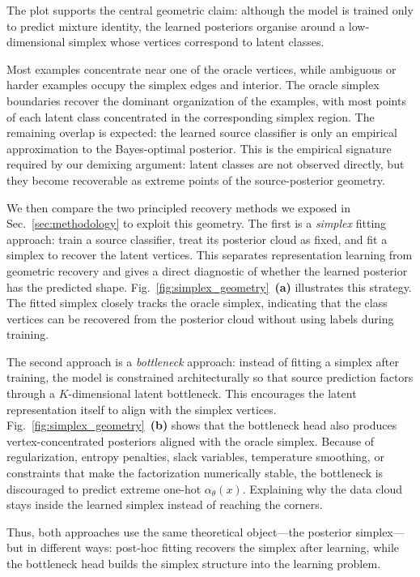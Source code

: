 \documentclass{article}
\theoremstyle{plain}
\theoremstyle{definition}
\theoremstyle{remark}
\begin{document}
The plot supports the central geometric claim: although the model is trained only to predict mixture identity, the learned posteriors organise around a low-dimensional simplex whose vertices correspond to latent classes.

Most examples concentrate near one of the oracle vertices, while ambiguous or harder examples occupy the simplex edges and interior. The oracle simplex boundaries recover the dominant organization of the examples, with most points of each latent class concentrated in the corresponding simplex region. The remaining overlap is expected: the learned source classifier is only an empirical approximation to the Bayes-optimal posterior.
This is the empirical signature required by our demixing argument: latent classes are not observed directly, but they become recoverable as extreme points of the source-posterior geometry.

We then compare the two principled recovery methods we exposed in Sec.~\ref{sec:methodology} to exploit this geometry.
The first is a \emph{simplex} fitting approach: train a source classifier, treat its posterior cloud as fixed, and fit a simplex to recover the latent vertices.
This separates representation learning from geometric recovery and gives a direct diagnostic of whether the learned posterior has the predicted shape.
Fig.~\ref{fig:simplex_geometry}~\textbf{(a)} illustrates this strategy.
The fitted simplex closely tracks the oracle simplex, indicating that the class vertices can be recovered from the posterior cloud without using labels during training. 

The second approach is a \emph{bottleneck} approach: instead of fitting a simplex after training, the model is constrained architecturally so that source prediction factors through a $K$-dimensional latent bottleneck.
This encourages the latent representation itself to align with the simplex vertices. 
Fig.~\ref{fig:simplex_geometry}~\textbf{(b)} shows that the bottleneck head also produces vertex-concentrated posteriors aligned with the oracle simplex. Because of regularization, entropy penalties, slack variables, temperature smoothing, or constraints that make the factorization numerically stable, the bottleneck is discouraged to predict extreme one-hot $\alpha_\theta(x)$. Explaining why the data cloud stays inside the learned simplex instead of reaching the corners.

Thus, both approaches use the same theoretical object---the posterior simplex---but in different ways: post-hoc fitting recovers the simplex after learning, while the bottleneck head builds the simplex structure into the learning problem. 
\end{document}
